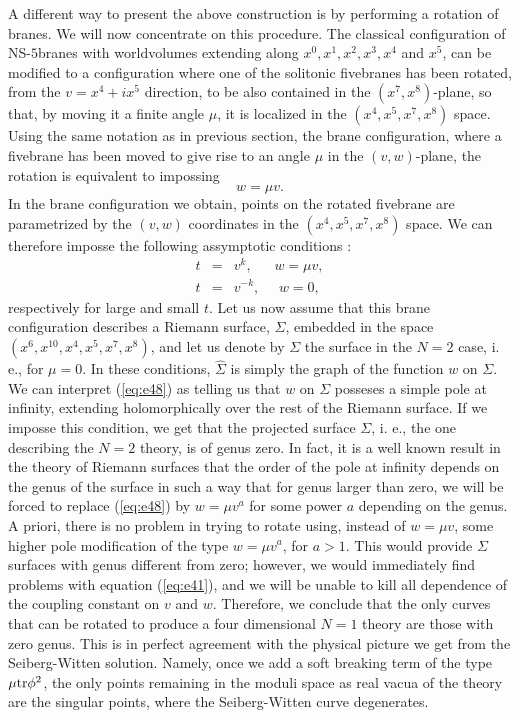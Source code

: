 A different way to present the above construction is by
performing a rotation of branes. We will now concentrate on this
procedure. The classical configuration of NS-$5$branes with
worldvolumes extending along $x^0,x^1,x^2,x^3,x^4$ and $x^5$, can
be modified to a configuration where one of the solitonic
fivebranes has been rotated, from the $v=x^4+ix^5$ direction, to
be also contained in the $(x^7,x^8)$-plane, so that, by moving it
a finite angle $\mu$, it is localized in the $(x^4,x^5,x^7,x^8)$
space. Using the same notation as in previous section, the brane
configuration, where a fivebrane has been moved to give rise to
an angle $\mu$ in the $(v,w)$-plane, the rotation is equivalent
to impossing
\begin{equation}
w= \mu v.
\label{eq:e48}
\end{equation}
In the brane configuration we obtain, points on the rotated
fivebrane are parametrized by the $(v,w)$ coordinates in the
$(x^4,x^5,x^7,x^8)$ space. We can therefore imposse the following
assymptotic conditions \cite{Oz}:
\begin{eqnarray}
t & = & v^k, \: \: \: \: \: \: \: w=\mu v, \nonumber \\
t & = & v^{-k}, \: \: \: \: \: \: w=0, 
\label{eq:e48b}
\end{eqnarray}
respectively for large and small $t$. Let us now assume that this
brane configuration describes a Riemann surface, $\hat{\Sigma}$,
embedded in the space $(x^6,x^{10},x^4,x^5,x^7,x^8)$, and let us
denote by $\Sigma$ the surface in the $N=2$ case, i. e., for
$\mu=0$. In these conditions, $\hat{\Sigma}$ is simply the graph
of the function $w$ on $\Sigma$. We can interpret (\ref{eq:e48})
as telling us that $w$ on $\Sigma$ posseses a simple pole at
infinity, extending holomorphically over the rest of the Riemann
surface. If we imposse this condition, we get that the projected
surface $\Sigma$, i. e., the one describing the $N=2$ theory, is
of genus zero. In fact, it is a well known result in the theory
of Riemann surfaces that the order of the pole at infinity
depends on the genus of the surface in such a way that for genus
larger than zero, we will be forced to replace (\ref{eq:e48}) by
$w=\mu v^{a}$ for some power $a$ depending on the genus. A
priori, there is no problem in trying to rotate using,
instead of $w=\mu v$, some higher pole modification of the type
$w=\mu v^{a}$, for $a>1$. This would provide $\Sigma$ surfaces
with genus different from zero; however, we would immediately
find problems with equation (\ref{eq:e41}), and we will be unable
to kill all dependence of the coupling constant on $v$ and $w$.
Therefore, we conclude that the only curves that can be rotated
to produce a four dimensional $N=1$ theory are those with zero
genus. This is in perfect agreement with the physical picture we
get from the Seiberg-Witten solution. Namely, once we add a soft
breaking term of the type $\mu \hbox {tr} \phi^2$, the only
points remaining in the moduli space as real vacua of the theory
are the singular points, where the Seiberg-Witten curve
degenerates.

